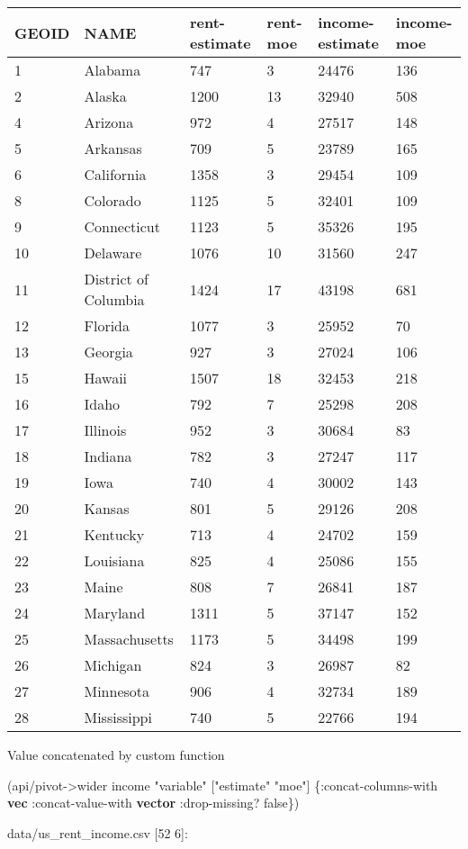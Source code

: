 \documentclass[]{article}
\newenvironment{Shaded}{\begin{snugshade}}{\end{snugshade}}
\newcommand{\AttributeTok}[1]{\textcolor[rgb]{0.77,0.63,0.00}{#1}}
\newcommand{\KeywordTok}[1]{\textcolor[rgb]{0.13,0.29,0.53}{\textbf{#1}}}
\newcommand{\NormalTok}[1]{#1}
\newcommand{\StringTok}[1]{\textcolor[rgb]{0.31,0.60,0.02}{#1}}
\newcommand{\VariableTok}[1]{\textcolor[rgb]{0.00,0.00,0.00}{#1}}
\begin{document}
\begin{longtable}[]{@{}llllll@{}}
\toprule
GEOID & NAME & rent-estimate & rent-moe & income-estimate &
income-moe\tabularnewline
\midrule
\endhead
1 & Alabama & 747 & 3 & 24476 & 136\tabularnewline
2 & Alaska & 1200 & 13 & 32940 & 508\tabularnewline
4 & Arizona & 972 & 4 & 27517 & 148\tabularnewline
5 & Arkansas & 709 & 5 & 23789 & 165\tabularnewline
6 & California & 1358 & 3 & 29454 & 109\tabularnewline
8 & Colorado & 1125 & 5 & 32401 & 109\tabularnewline
9 & Connecticut & 1123 & 5 & 35326 & 195\tabularnewline
10 & Delaware & 1076 & 10 & 31560 & 247\tabularnewline
11 & District of Columbia & 1424 & 17 & 43198 & 681\tabularnewline
12 & Florida & 1077 & 3 & 25952 & 70\tabularnewline
13 & Georgia & 927 & 3 & 27024 & 106\tabularnewline
15 & Hawaii & 1507 & 18 & 32453 & 218\tabularnewline
16 & Idaho & 792 & 7 & 25298 & 208\tabularnewline
17 & Illinois & 952 & 3 & 30684 & 83\tabularnewline
18 & Indiana & 782 & 3 & 27247 & 117\tabularnewline
19 & Iowa & 740 & 4 & 30002 & 143\tabularnewline
20 & Kansas & 801 & 5 & 29126 & 208\tabularnewline
21 & Kentucky & 713 & 4 & 24702 & 159\tabularnewline
22 & Louisiana & 825 & 4 & 25086 & 155\tabularnewline
23 & Maine & 808 & 7 & 26841 & 187\tabularnewline
24 & Maryland & 1311 & 5 & 37147 & 152\tabularnewline
25 & Massachusetts & 1173 & 5 & 34498 & 199\tabularnewline
26 & Michigan & 824 & 3 & 26987 & 82\tabularnewline
27 & Minnesota & 906 & 4 & 32734 & 189\tabularnewline
28 & Mississippi & 740 & 5 & 22766 & 194\tabularnewline
\bottomrule
\end{longtable}

Value concatenated by custom function

\begin{Shaded}
\begin{Highlighting}[]
\NormalTok{(api/pivot->wider income }\StringTok{"variable"}\NormalTok{ [}\StringTok{"estimate"} \StringTok{"moe"}\NormalTok{] \{}\AttributeTok{:concat-columns-with} \KeywordTok{vec}
                                                        \AttributeTok{:concat-value-with} \KeywordTok{vector}
                                                        \AttributeTok{:drop-missing}\NormalTok{? }\VariableTok{false}\NormalTok{\})}
\end{Highlighting}
\end{Shaded}

data/us\_rent\_income.csv {[}52 6{]}:
\end{document}
